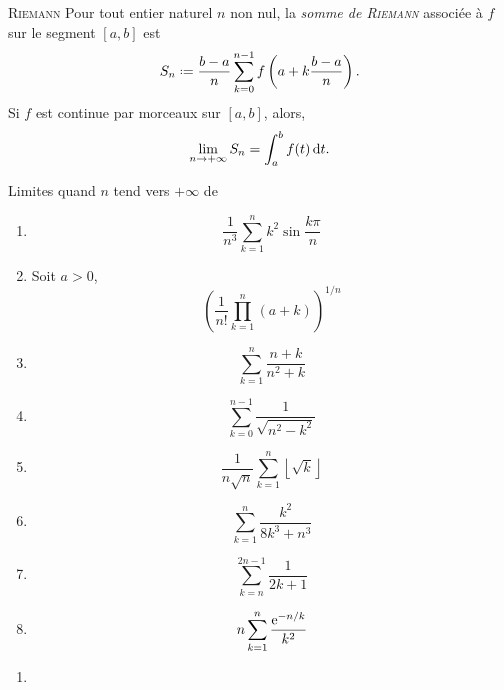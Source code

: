 \begin{theo}{\textsc{Riemann}}
    Pour tout entier naturel $n$ non nul, la \emph{somme de \textsc{Riemann}} associée à $f$ sur le segment $[a, b]$ est 
    $$S_n \defeq \frac{b-a}{n} \sum\limits_{k=0}^{n-1} f \left( a + k \frac{b-a}{n} \right).$$
    Si $f$ est continue par morceaux sur $[a, b]$, alors, 
    $$\lim_{n \to + \infty} S_n = \int_a^b f(t) \, \mathrm{d} t.$$
\end{theo}

\begin{marginfigure}[-3cm]
    
\end{marginfigure}

\begin{preuve}
    
\end{preuve}

\begin{exercice}
    Limites quand $n$ tend vers $+ \infty$ de 
    \begin{multicols}{2}
        \begin{enumerate}
            \item $$\frac{1}{n^3} \sum_{k=1}^n k^2 \sin \frac{k \pi}{n}$$
            \item Soit $a > 0$, 
            $$\left( \frac{1}{n!} \prod_{k=1}^n (a+k) \right)^{1/n}$$
            \item $$\sum_{k=1}^n \frac{n+k}{n^2+k}$$
            \item $$\sum_{k=0}^{n-1} \frac{1}{\sqrt{n^2-k^2}}$$
            \item $$\frac{1}{n \sqrt{n}} \sum_{k=1}^n \left \lfloor \sqrt{k} \right \rfloor$$
            \item $$\sum_{k=1}^n \frac{k^2}{8k^3 + n^3}$$
            \item $$\sum_{k=n}^{2n-1} \frac{1}{2k+1}$$
            \item $$n \sum_{k=1}^n \frac{\mathrm{e}^{-n/k}}{k^2}$$
        \end{enumerate}
    \end{multicols}
\end{exercice}

\begin{solution}
    \begin{enumerate}
        \item 
    \end{enumerate}
\end{solution}


